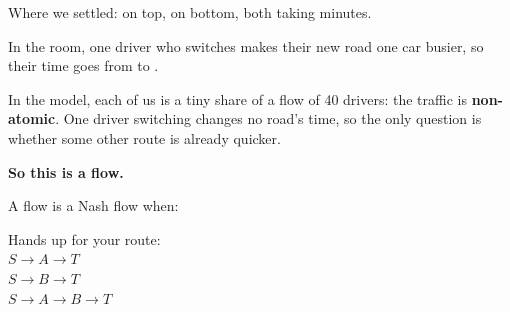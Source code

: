 {\large Where we settled:  on top,
 on bottom, both taking 
minutes.}

\vspace{0.6cm}

{\large In the room, one driver who switches makes their new road one car busier,
so their time goes from  to .}

\vspace{0.6cm}

{\large In the model, each of us is a tiny share of a flow of 40 drivers: the
traffic is \textbf{non-atomic}. One driver switching changes no road's time, so
the only question is whether some other route is already quicker.}

\vspace{0.6cm}

{\large\bfseries So this is a  flow.}

\vspace{0.4cm}

{\small\color{inkgrey} A flow is a Nash flow when:}\\[0.4em]

\newpage
{}

\vspace{0.6cm}

\begin{minipage}[c]{0.60\linewidth}
\begin{center}
\end{center}
\end{minipage}
\hfill
\begin{minipage}[c]{0.36\linewidth}
{\large\color{inkgrey} Hands up for your route:}\\[0.8em]
{\large
  $S \to A \to T$ \hspace{0.4cm} \\[1.5em]
  $S \to B \to T$ \hspace{0.4cm} \\[1.5em]
  {\color{inkred}$S \to A \to B \to T$} \hspace{0.4cm}
    }
\end{minipage}

